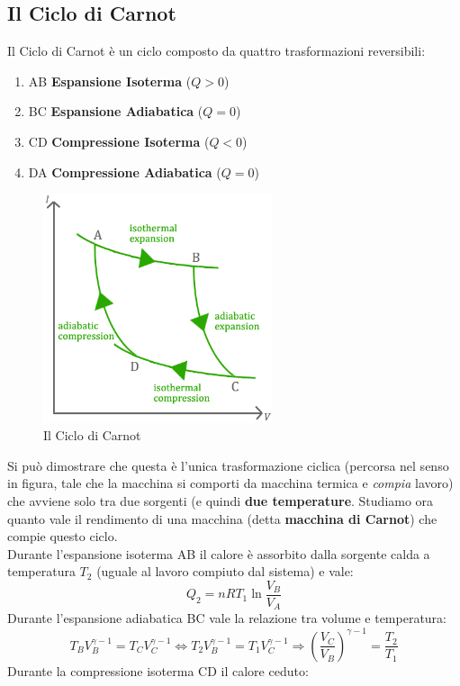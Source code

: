 \documentclass{article}
\newcommand{\then}{\ensuremath{\Rightarrow}}
\begin{document}
\subsection{Il Ciclo di Carnot}
Il Ciclo di Carnot è un ciclo composto da quattro trasformazioni reversibili:
\begin{enumerate}
    \item AB \textbf{Espansione Isoterma} ($Q>0$)
    \item BC \textbf{Espansione Adiabatica} ($Q=0$)
    \item CD \textbf{Compressione Isoterma} ($Q<0$)
    \item DA \textbf{Compressione Adiabatica} ($Q=0$)
\end{enumerate}
\begin{figure}[H]
    \centering
    \includegraphics[width=0.6\textwidth]{CicloCarnot.png}
    \caption{Il Ciclo di Carnot}
    \label{CicloCarnot}
\end{figure}
Si può dimostrare che questa è l'unica trasformazione ciclica (percorsa nel senso in figura, tale che la macchina si comporti da macchina termica e \textit{compia} lavoro) che avviene solo tra due sorgenti (e quindi \textbf{due temperature}. Studiamo ora quanto vale il rendimento di una macchina (detta \textbf{macchina di Carnot}) che compie questo ciclo. \\
Durante l'espansione isoterma AB il calore è assorbito dalla sorgente calda a temperatura $T_2$ (uguale al lavoro compiuto dal sistema) e vale:
\[Q_2=nRT_1\ln\frac{V_B}{V_A}\]
Durante l'espansione adiabatica BC vale la relazione tra volume e temperatura:
\[T_BV_B^{\gamma-1}=T_CV_C^{\gamma-1}\iff T_2V_B^{\gamma-1}=T_1V_C^{\gamma-1}\then \left(\frac{V_C}{V_B}\right)^{\gamma-1}=\frac{T_2}{T_1}\]
Durante la compressione isoterma CD il calore ceduto:
\end{document}
